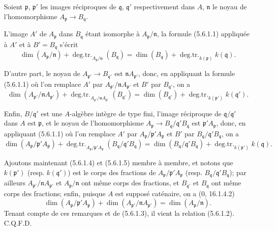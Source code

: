\documentclass[10pt,oneside]{book}
\newcommand{\oldpage}[2][]{%
  \setcounter{footnote}{0}%
  \marginpar{\scriptsize\textbf{#1}~|~#2}\ignorespaces}
\begin{document}
\oldpage[IV-2]{98}

Soient $\mathfrak p$, $\mathfrak p'$ les images réciproques de
$\mathfrak q$, $\mathfrak q'$ respectivement dans $A$, $\mathfrak n$ le
noyau de l'homomorphisme $A_{\mathfrak p}\to B_{\mathfrak q}$.

L'image $A'$ de $A_{\mathfrak p}$ dans $B_{\mathfrak q}$ étant isomorphe à
$A_{\mathfrak p}/\mathfrak n$, la formule (5.6.1.1) appliquée à $A'$ et à
$B'=B_{\mathfrak q}$ s'écrit
\begin{equation}
\dim(A_{\mathfrak p}/\mathfrak n)
+\operatorname{deg.tr.}_{A_{\mathfrak p}/\mathfrak n}(B_{\mathfrak q})
=\dim(B_{\mathfrak q})
+\operatorname{deg.tr.}_{k(\mathfrak p)}k(\mathfrak q).
\tag{5.6.1.3}\label{IV.2.s5.6.1.3-fr}
\end{equation}

D'autre part, le noyau de $A_{\mathfrak p'}\to B_{\mathfrak q'}$ est
$\mathfrak nA_{\mathfrak p'}$, donc, en appliquant la formule (5.6.1.1) où
l'on remplace $A'$ par $A_{\mathfrak p'}/\mathfrak nA_{\mathfrak p'}$ et
$B'$ par $B_{\mathfrak q'}$, on a
\begin{equation}
\dim(A_{\mathfrak p'}/\mathfrak nA_{\mathfrak p'})
+\operatorname{deg.tr.}_{A_{\mathfrak p'}/\mathfrak nA_{\mathfrak p'}}
(B_{\mathfrak q'})
=\dim(B_{\mathfrak q'})
+\operatorname{deg.tr.}_{k(\mathfrak p')}k(\mathfrak q').
\tag{5.6.1.4}\label{IV.2.s5.6.1.4-fr}
\end{equation}

Enfin, $B/\mathfrak q'$ est une $A$-algèbre intègre de type fini, l'image
réciproque de $\mathfrak q/\mathfrak q'$ dans $A$ est $\mathfrak p$, et le
noyau de l'homomorphisme
$A_{\mathfrak p}\to B_{\mathfrak q}/\mathfrak q'B_{\mathfrak q}$ est
$\mathfrak p'A_{\mathfrak p}$, donc, en appliquant (5.6.1.1) où l'on
remplace $A'$ par $A_{\mathfrak p}/\mathfrak p'A_{\mathfrak p}$ et $B'$ par
$B_{\mathfrak q}/\mathfrak q'B_{\mathfrak q}$, on a
\begin{equation}
\dim(A_{\mathfrak p}/\mathfrak p'A_{\mathfrak p})
+\operatorname{deg.tr.}_{A_{\mathfrak p}/\mathfrak p'A_{\mathfrak p}}
(B_{\mathfrak q}/\mathfrak q'B_{\mathfrak q})
=\dim(B_{\mathfrak q}/\mathfrak q'B_{\mathfrak q})
+\operatorname{deg.tr.}_{k(\mathfrak p')}k(\mathfrak q).
\tag{5.6.1.5}\label{IV.2.s5.6.1.5-fr}
\end{equation}

Ajoutons maintenant (5.6.1.4) et (5.6.1.5) membre à membre, et notons que
$k(\mathfrak p')$ (resp. $k(\mathfrak q')$) est le corps des fractions de
$A_{\mathfrak p}/\mathfrak p'A_{\mathfrak p}$ (resp.
$B_{\mathfrak q}/\mathfrak q'B_{\mathfrak q}$); par ailleurs
$A_{\mathfrak p'}/\mathfrak nA_{\mathfrak p'}$ et
$A_{\mathfrak p}/\mathfrak n$ ont même corps des fractions, et
$B_{\mathfrak q'}$ et $B_{\mathfrak q}$ ont même corps des fractions;
enfin, puisque $A$ est supposé caténaire, on a (0, 16.1.4.2)
\[
\dim(A_{\mathfrak p}/\mathfrak p'A_{\mathfrak p})
+\dim(A_{\mathfrak p'}/\mathfrak nA_{\mathfrak p'})
=\dim(A_{\mathfrak p}/\mathfrak n).
\]
Tenant compte de ces remarques et de (5.6.1.3), il vient la relation
(5.6.1.2). C.Q.F.D.
\end{document}
